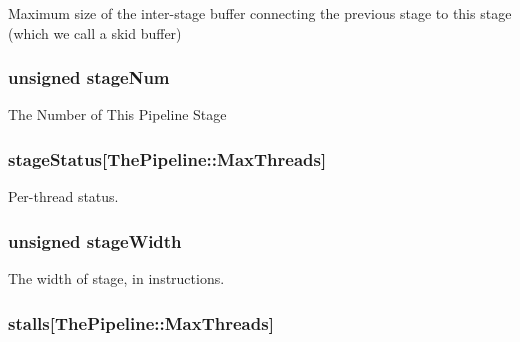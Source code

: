 \label{classPipelineStage_a8b3bf50b9e561c023857979eaf326bee}
Maximum size of the inter-\/stage buffer connecting the previous stage to this stage (which we call a skid buffer) \hypertarget{classPipelineStage_afc0a9a26d747553fd1fd8e698a8e7029}{
\subsubsection[{stageNum}]{\setlength{\rightskip}{0pt plus 5cm}unsigned {\bf stageNum}}}
\label{classPipelineStage_afc0a9a26d747553fd1fd8e698a8e7029}
The Number of This Pipeline Stage \hypertarget{classPipelineStage_af95a0e3fe4e1c0a168cc3c74869a4816}{
\subsubsection[{stageStatus}]{ {\bf stageStatus}\mbox{[}{\bf ThePipeline::MaxThreads}\mbox{]}}}
\label{classPipelineStage_af95a0e3fe4e1c0a168cc3c74869a4816}
Per-\/thread status. \hypertarget{classPipelineStage_a51d98139f56a84585e4cb68e3cd67a1c}{
\subsubsection[{stageWidth}]{\setlength{\rightskip}{0pt plus 5cm}unsigned {\bf stageWidth}}}
\label{classPipelineStage_a51d98139f56a84585e4cb68e3cd67a1c}
The width of stage, in instructions. \hypertarget{classPipelineStage_aa7522ea079359a7730812c7091dbb4a5}{
\subsubsection[{stalls}]{ {\bf stalls}\mbox{[}{\bf ThePipeline::MaxThreads}\mbox{]}}}
\label{classPipelineStage_aa7522ea079359a7730812c7091dbb4a5}

